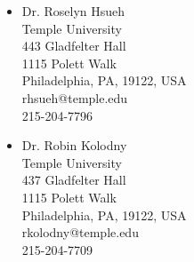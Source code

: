 \documentclass[margin, 12pt]{res} %
\begin{document}
\begin{resume}
\begin{minipage}[ht]{0.5\textwidth}
\begin{itemize}
\item Dr. Roselyn Hsueh \\
Temple University \\
443 Gladfelter Hall \\
1115 Polett Walk \\
Philadelphia, PA, 19122, USA \\
rhsueh@temple.edu \\
215-204-7796 \\
\end{itemize}

\begin{itemize}
\item Dr. Robin Kolodny \\
Temple University \\
437 Gladfelter Hall \\
1115 Polett Walk \\
Philadelphia, PA, 19122, USA \\
rkolodny@temple.edu \\
215-204-7709 \\
\end{itemize}

\end{minipage}


\end{resume}
\end{document}
